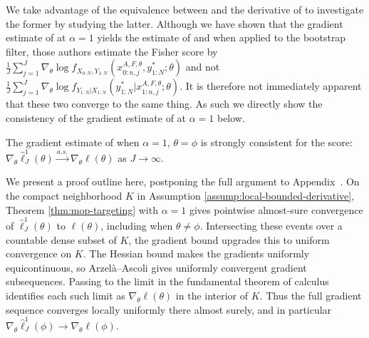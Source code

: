 
We take advantage of the equivalence between  and the derivative of  to investigate the former by studying the latter.
Although we have shown that the gradient estimate of  at $\alpha=1$ yields the estimate of \cite{poyiadjis11} and \cite{scibior21} when applied to the bootstrap filter, those authors estimate the Fisher score by 
$\frac{1}{J}\sum_{j=1}^J \nabla_\theta \log f_{X_{0:N}, Y_{1:N}}(x_{0:n,j}^{A, F,\theta}, y_{1:N}^* ; \theta)$ and not
$\frac{1}{J}\sum_{j=1}^J \nabla_\theta \log f_{Y_{1:N}| X_{1:N}}(y_{1:N}^* | x_{1:n,j}^{A, F,\theta}; \theta).$
It is therefore not immediately apparent that these two converge to the same thing.
As such we directly show the consistency of the gradient estimate of  at $\alpha=1$ below. 

\begin{thm}
    The gradient estimate of  when $\alpha=1$, $\theta=\phi$ is strongly consistent for the score: $\nabla_\theta \hat\ell_J^1(\theta) \stackrel{a.s.}{\to} \nabla_\theta \ell(\theta)$ as $J \to \infty$.
    \label{thm:mop-grad-consistency}
\end{thm}

We present a proof outline here, postponing the full argument to Appendix~\suppSecProofConsistency.
On the compact neighborhood $K$ in Assumption \ref{assump:local-bounded-derivative}, Theorem \ref{thm:mop-targeting} with $\alpha=1$ gives pointwise almost-sure convergence of $\hat\ell_J^1(\theta)$ to $\ell(\theta)$, including when $\theta\ne\phi$. Intersecting these events over a countable dense subset of $K$, the gradient bound upgrades this to uniform convergence on $K$. The Hessian bound makes the gradients uniformly equicontinuous, so Arzel\`a--Ascoli gives uniformly convergent gradient subsequences. Passing to the limit in the fundamental theorem of calculus identifies each such limit as $\nabla_\theta\ell(\theta)$ in the interior of $K$. Thus the full gradient sequence converges locally uniformly there almost surely, and in particular $\nabla_\theta\hat\ell_J^1(\phi)\to\nabla_\theta\ell(\phi)$.


